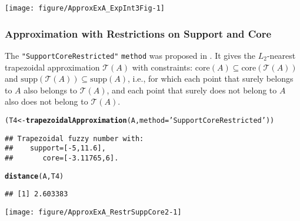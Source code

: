 \documentclass[11pt]{article}\usepackage[]{graphicx}\usepackage[]{color}
\makeatletter
\newcommand{\hlstr}[1]{\textcolor[rgb]{0.192,0.494,0.8}{#1}}%
\newcommand{\hlstd}[1]{\textcolor[rgb]{0.345,0.345,0.345}{#1}}%
\newcommand{\hlkwb}[1]{\textcolor[rgb]{0.69,0.353,0.396}{#1}}%
\newcommand{\hlkwc}[1]{\textcolor[rgb]{0.333,0.667,0.333}{#1}}%
\newcommand{\hlkwd}[1]{\textcolor[rgb]{0.737,0.353,0.396}{\textbf{#1}}}%
\newenvironment{kframe}{%
 \def\at@end@of@kframe{}%
 \ifinner\ifhmode%
  \def\at@end@of@kframe{\end{minipage}}%
  \begin{minipage}{\columnwidth}%
 \fi\fi%
 \def\FrameCommand##1{\hskip\@totalleftmargin \hskip-\fboxsep
 \colorbox{shadecolor}{##1}\hskip-\fboxsep
     \hskip-\linewidth \hskip-\@totalleftmargin \hskip\columnwidth}%
 \MakeFramed {\advance\hsize-\width
   \@totalleftmargin\z@ \linewidth\hsize
   \@setminipage}}%
 {\par\unskip\endMakeFramed%
 \at@end@of@kframe}
\newenvironment{knitrout}{}{} %
\newcommand{\argument}[1]{\texttt{\hlkwc{#1}}}
\newcommand{\str}[1]{\texttt{\hlstr{#1}}}
\makeatother
\begin{document}
\begin{center}
\begin{knitrout}\small
{}\color{fgcolor}

{\centering \texttt{[image: figure/ApproxExA\_ExpInt3Fig-1]} 

}



\end{knitrout}
\end{center}


\subsubsection{Approximation with Restrictions on Support and Core}


The \str{"{}SupportCoreRestricted"{}} \argument{method}
was proposed in \cite{GrzegorzewskiPasternak2011:trapapproxsupcore}.
It gives the $L_2$-nearest trapezoidal approximation $\mathcal{T}(A)$
with constraints:
$\mathrm{core}(A) \subseteq \mathrm{core}(\mathcal{T}(A))$
and $\mathrm{supp}(\mathcal{T}(A)) \subseteq \mathrm{supp}(A)$,
i.e., for which each point that surely belongs to $A$ also belongs to $\mathcal{T}(A)$,
and each point that surely does not belong to $A$ also does not belong to $\mathcal{T}(A)$.

\begin{knitrout}\small
{}\color{fgcolor}\begin{kframe}
\begin{alltt}
\hlstd{(T4} \hlkwb{<-} \hlkwd{trapezoidalApproximation}\hlstd{(A,} \hlkwc{method}\hlstd{=}\hlstr{'SupportCoreRestricted'}\hlstd{))}
\end{alltt}
\begin{verbatim}
## Trapezoidal fuzzy number with:
##    support=[-5,11.6],
##       core=[-3.11765,6].
\end{verbatim}
\begin{alltt}
\hlkwd{distance}\hlstd{(A, T4)}
\end{alltt}
\begin{verbatim}
## [1] 2.603383
\end{verbatim}
\end{kframe}
\end{knitrout}

\begin{center}
\begin{knitrout}\small
{}\color{fgcolor}

{\centering \texttt{[image: figure/ApproxExA\_RestrSuppCore2-1]} 

}



\end{knitrout}
\end{center}
\end{document}

